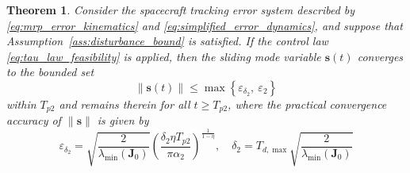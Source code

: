 \documentclass[journal]{new-aiaa}
\newtheorem{theorem}{Theorem}
\begin{document}
\begin{theorem}
\label{thm:sliding_convergence}
Consider the spacecraft tracking error system described by 
\eqref{eq:mrp_error_kinematics} and \eqref{eq:simplified_error_dynamics}, 
and suppose that Assumption~\ref{ass:disturbance_bound} is satisfied. 
If the control law \eqref{eq:tau_law_feasibility} is applied, 
then the sliding mode variable $\boldsymbol{s}(t)$ converges to the bounded set
\begin{equation}
\|\boldsymbol{s}(t)\| \le \max\left\{ \varepsilon_{\delta_2},\ \varepsilon_2 \right\}
\end{equation}
within $T_{p2}$ and remains therein for all $t \ge T_{p2}$, where the practical convergence accuracy of $\|\boldsymbol{s}\|$ is given by
\begin{equation}
\varepsilon_{\delta_2} = \sqrt{\frac{2}{\lambda_{\min}(\boldsymbol{J}_0)}} \left( \frac{\delta_2 \eta T_{p2}}{\pi \alpha_2} \right)^{\frac{1}{1 - \eta}}, \quad
\delta_2 = T_{d,\max} \sqrt{\frac{2}{\lambda_{\min}(\boldsymbol{J}_0)}}
\end{equation}
\end{theorem}
\end{document}
